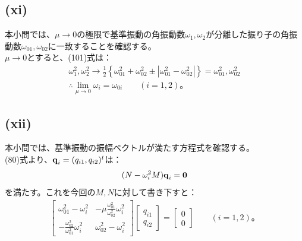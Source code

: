   \subsection*{(xi)}
  本小問では、$\mu\to0$の極限で基準振動の角振動数$\omega_1,\omega_2$が分離した振り子の角振動数$\omega_{01},\omega_{02}$に一致することを確認する。\\
  $\mu\to0$とすると、(101)式は：
  \begin{align*}
    \omega_1^2,\omega_2^2\longrightarrow \frac{1}{2}\left\{\omega_{01}^2+\omega_{02}^2\pm|\omega_{01}^2-\omega_{02}^2|\right\}=\omega_{01}^2,\omega_{02}^2\\
    \therefore \lim_{\mu\to0}\omega_i=\omega_{0i}\qquad(i=1,2)。\tag{102}
  \end{align*}
  
  \subsection*{(xii)}
  本小問では、基準振動の振幅ベクトルが満たす方程式を確認する。\\
  (80)式より、$\boldsymbol{\mathrm{q}}_i=(q_{i1},q_{i2})^{t}$は：
  \begin{align*}
    (N-\omega_i^2M)\boldsymbol{\mathrm{q}}_i=\boldsymbol{\mathrm{0}}
  \end{align*}
  を満たす。これを今回の$M,N$に対して書き下すと：
  \begin{align*}
    \begin{bmatrix}
      \omega_{01}^2-\omega_i^2 & -\mu\frac{\omega_{01}^2}{\omega_{02}^2}\omega_i^2\\
      -\frac{\omega_{02}^2}{\omega_{01}^2}\omega_i^2 & \omega_{02}^2-\omega_i^2
    \end{bmatrix}
    \begin{bmatrix}
      q_{i1}\\q_{i2}
    \end{bmatrix}
    =
    \begin{bmatrix}
      0\\0
    \end{bmatrix}
    \qquad(i=1,2)。\tag{103}
  \end{align*}
  

